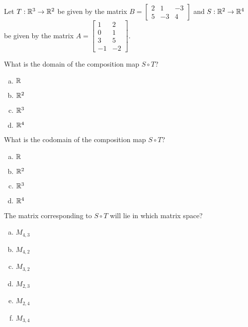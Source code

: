 
\begin{applicationActivities}{1}{21}

\begin{activity}{0}
Let $T: \mathbb{R}^3 \rightarrow \mathbb{R}^2$ be given by the matrix $B=\begin{bmatrix} 2 & 1 & -3 \\ 5 & -3 & 4 \end{bmatrix}$ and $S: \mathbb{R}^2 \rightarrow \mathbb{R}^4$ be given by the matrix $A=\begin{bmatrix} 1 & 2 \\ 0 & 1 \\ 3 & 5 \\ -1 & -2 \end{bmatrix}$.

What is the domain of the composition map $S \circ T$?
\begin{enumerate}[(a)]
\item $\mathbb{R}$
\item $\mathbb{R}^2$
\item $\mathbb{R}^3$
\item $\mathbb{R}^4$
\end{enumerate}
\end{activity}

\begin{activity}{0}
What is the codomain of the composition map $S \circ T$?
\begin{enumerate}[(a)]
\item $\mathbb{R}$
\item $\mathbb{R}^2$
\item $\mathbb{R}^3$
\item $\mathbb{R}^4$
\end{enumerate}
\end{activity}

\begin{activity}{0}
The matrix corresponding to $S \circ T$ will lie in which matrix space?
\begin{enumerate}[(a)]
\item $M_{4,3}$
\item $M_{4,2}$
\item $M_{3,2}$
\item $M_{2,3}$
\item $M_{2,4}$
\item $M_{3,4}$
\end{enumerate}
\end{activity}


\end{applicationActivities}
